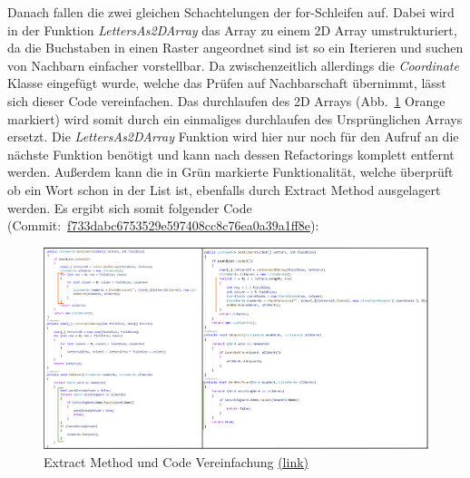 Danach fallen die zwei gleichen Schachtelungen der for-Schleifen auf. Dabei wird in der Funktion \textit{LettersAs2DArray} das Array zu einem 2D Array umstrukturiert, da die Buchstaben in einen Raster angeordnet sind ist so ein Iterieren und suchen von Nachbarn einfacher vorstellbar. Da zwischenzeitlich allerdings die \textit{Coordinate} Klasse eingefügt wurde, welche das Prüfen auf Nachbarschaft übernimmt, lässt sich dieser Code vereinfachen. Das durchlaufen des 2D Arrays (Abb.~\ref{Abb:CodeVereinfachen} Orange markiert) wird somit durch ein einmaliges durchlaufen des Ursprünglichen Arrays ersetzt. Die \textit{LettersAs2DArray} Funktion wird hier nur noch für den Aufruf an die nächste Funktion benötigt und kann nach dessen Refactorings komplett entfernt werden. Außerdem kann die in Grün markierte Funktionalität, welche überprüft ob ein Wort schon in der List ist, ebenfalls durch Extract Method ausgelagert werden. Es ergibt sich somit folgender Code (Commit:~\href{https://github.com/EinToni/Wortfinder/commit/f733dabc6753529e597408cc8c76ea0a39a1ff8e}{f733dabc6753529e597408cc8c76ea0a39a1ff8e}):

\begin{figure}[!ht]
  \centering
  \includegraphics[width=\textwidth]{Bilder/CodeVereinfachen.PNG}
  \caption[Extract Method und Code Vereinfachung]{Extract Method und Code Vereinfachung \href{https://github.com/EinToni/WortfinderDoku/blob/main/Bilder/CodeVereinfachen.png}{(link)}}
  \label{Abb:CodeVereinfachen}
\end{figure}


